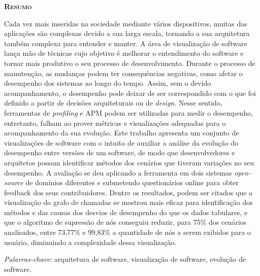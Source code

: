 \begin{center}
	{\Large{\textbf{\mscThesisTitle}}}
\end{center}

\vspace{1cm}


\vspace{1cm}

\begin{center}
	\Large{\textsc{\textbf{Resumo}}}
\end{center}

\noindent Cada vez mais inseridas na sociedade mediante vários dispositivos, muitas das aplicações são complexas devido a sua larga escala, tornando a sua arquitetura também complexa para entender e manter. A área de visualização de software lança mão de técnicas cujo objetivo é melhorar o entendimento do software e tornar mais produtivo o seu processo de desenvolvimento. Durante o processo de manutenção, as mudanças podem ter consequências negativas, como afetar o desempenho dos sistemas ao longo do tempo. Assim, sem o devido acompanhamento, o desempenho pode deixar de ser correspondido com o que foi definido a partir de decisões arquiteturais ou de \textit{design}. Nesse sentido, ferramentas de \textit{profiling} e APM podem ser utilizadas para medir o desempenho, entretanto, falham ao prover métricas e visualizações adequadas para o acompanhamento da sua evolução. Este trabalho apresenta um conjunto de visualizações de software com o intuito de auxiliar a análise da evolução do desempenho entre versões de um software, de modo que desenvolvedores e arquitetos possam identificar métodos dos cenários que tiveram variações no seu desempenho. A avaliação se deu aplicando a ferramenta em dois sistemas \textit{open-source} de domínios diferentes e submetendo questionários online para obter feedback dos seus contribuidores. Dentre os resultados, podem ser citados que a visualização do grafo de chamadas se mostrou mais eficaz para identificação dos métodos e das causas dos desvios de desempenho do que os dados tabulares, e que o algoritmo de supressão de nós conseguiu reduzir, para 75\% dos cenários analisados, entre 73,77\% e 99,83\% a quantidade de nós a serem exibidos para o usuário, diminuindo a complexidade dessa visualização.

\noindent\textit{Palavras-chave}: arquitetura de software, visualização de software, evolução de software.
